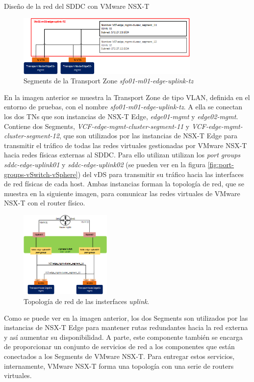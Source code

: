 \begin{subsubsection}{Diseño de la red del SDDC con VMware NSX-T}
    \begin{figure}[h]
        \centering
        \includegraphics[width=0.8\textwidth]{imaxes/pruebaconcepto/VLANTZSegments.png}
         \caption{Segments de la  Transport Zone \textit{sfo01-m01-edge-uplink-tz}}
        \label{fig:VLAN-TZ-segments-NSXT}
    \end{figure}
    \FloatBarrier
    En la imagen anterior se muestra la Transport Zone de tipo VLAN, definida en el entorno de pruebas, con el nombre \textit{sfo01-m01-edge-uplink-tz}. A ella se conectan los dos TNs que son instancias de NSX-T Edge, \textit{edge01-mgmt} y \textit{edge02-mgmt}. Contiene dos Segments, \textit{VCF-edge-mgmt-cluster-segment-11} y \textit{VCF-edge-mgmt-cluster-segment-12}, que son utilizados por las instancias de NSX-T Edge para transmitir el tráfico de todas las redes virtuales gestionadas por VMware NSX-T hacia redes físicas externas al SDDC. Para ello utilizan utilizan los \textit{port groups} \textit{sddc-edge-uplink01} y \textit{sddc-edge-uplink02} (se pueden ver en la figura \ref{fig:port-groups-vSwitch-vSphere}) del vDS para transmitir su tráfico hacia las interfaces de red físicas de cada host. Ambas instancias forman la topología de red, que se muestra en la siguiente imagen, para comunicar las redes virtuales de VMware NSX-T con el router físico.
    \begin{figure}[h]
        \centering
        \includegraphics[width=0.4\textwidth]{imaxes/pruebaconcepto/UplinkDesign.png}
        \caption{Topología de red de las insterfaces \textit{uplink}.}
        \label{fig:Uplink-Design-Edge-NSXT} 
    \end{figure}
    \FloatBarrier
    Como se puede ver en la imagen anterior, los dos Segments son utilizados por las instancias de NSX-T Edge para mantener rutas redundantes hacia la red externa y así aumentar su disponibilidad. A parte, este componente también se encarga de proporcionar un conjunto de servicios de red a los componentes que están conectados a los Segments de VMware NSX-T. Para entregar estos servicios, internamente, VMware NSX-T forma una topología con una serie de routers virtuales.

\end{subsubsection}
